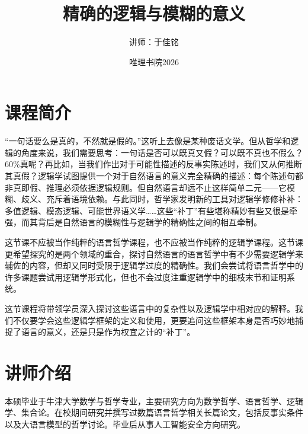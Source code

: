 \documentclass{article}
\title{\textbf{精确的逻辑与模糊的意义}}
\author{讲师：于佳铭}
\date{唯理书院2026}
\begin{document}
\maketitle

\section*{课程简介}

“一句话要么是真的，不然就是假的。”这听上去像是某种废话文学。但从哲学和逻辑的角度来说，我们需要思考：一句话是否可以既真又假？可以既不真也不假么？60\%真呢？再比如，当我们作出对于可能性描述的反事实陈述时，我们又从何推断其真假？逻辑学试图提供一个对于自然语言的意义完全精确的描述：每个陈述句都非真即假、推理必须依据逻辑规则。但自然语言却远不止这样简单二元——它模糊、歧义、充斥着语境依赖。与此同时，哲学家发明新的工具对逻辑学修修补补：多值逻辑、模态逻辑、可能世界语义学……这些“补丁”有些堪称精妙有些又很是牵强，而其背后是自然语言的模糊性与逻辑学的精确性之间的相互牵制。

这节课不应被当作纯粹的语言哲学课程，也不应被当作纯粹的逻辑学课程。这节课更希望探究的是两个领域的重合，探讨自然语言的语言哲学中有不少需要逻辑学来辅佐的内容，但却又同时受限于逻辑学过度的精确性。我们会尝试将语言哲学中的许多课题尝试用逻辑学形式化，但也不会过度注重逻辑学中的细枝末节和证明系统。

这节课程将带领学员深入探讨这些语言中的复杂性以及逻辑学中相对应的解释。我们不仅要学会这些逻辑学框架的定义和使用，更要追问这些框架本身是否巧妙地捕捉了语言的意义，还是只是作为权宜之计的“补丁”。


\section*{讲师介绍}

本硕毕业于牛津大学数学与哲学专业，主要研究方向为数学哲学、语言哲学、逻辑学、集合论。在校期间研究并撰写过数篇语言哲学相关长篇论文，包括反事实条件以及大语言模型的哲学讨论。毕业后从事人工智能安全方向研究。


%
\end{document}
